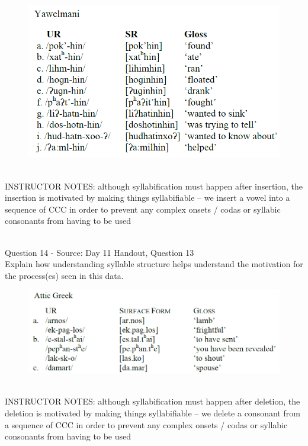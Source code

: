 \documentclass[12pt]{article}
\begin{document}
\begin{figure}[H]
\includegraphics{../images/yawelmani.png}
\end{figure}

~\\
INSTRUCTOR NOTES: although syllabification must happen after insertion, the insertion is motivated by making things syllabifiable -- we insert a vowel into a sequence of CCC in order to prevent any complex onsets / codas or syllabic consonants from having to be used


~\\

{\large Question 14} - Source: Day 11 Handout, Question 13\\

Explain how understanding syllable structure helps understand the motivation for the process(es) seen in this data.\\

\begin{figure}[H]
\includegraphics{../images/atticgreek.png}
\end{figure}

~\\
INSTRUCTOR NOTES: although syllabification must happen after deletion, the deletion is motivated by making things syllabifiable -- we delete a consonant from a sequence of CCC in order to prevent any complex onsets / codas or syllabic consonants from having to be used
\end{document}
